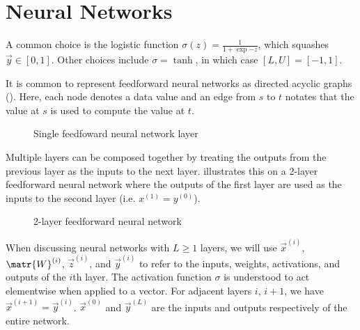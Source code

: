 





\section{Neural Networks}

A common choice is the logistic function $\sigma(z)
= \frac{1}{1+\exp{-z}}$, which squashes $\vec{y} \in [0, 1]$. Other choices
include $\sigma = \tanh$, in which case $[L, U] = [-1, 1]$.

It is common to represent feedforward neural networks as directed acyclic
graphs (). Here, each node denotes a data value and
an edge from $s$ to $t$ notates that the value at $s$ is used to compute the
value at $t$.

\begin{figure}[htpb]
    \centering
    
    \caption{Single feedfoward neural network layer}
    \label{fig:nn-layer}
\end{figure}

Multiple layers can be composed together by treating the outputs from the previous layer
as the inputs to the next layer.  illustrates this on a 2-layer
feedforward neural network where the outputs of the first layer are used as the
inputs to the second layer (i.e. $x^{(1)} = y^{(0)}$).


\begin{figure}[htbp]
    \centering
    
    \caption{2-layer feedforward neural network}
    \label{fig:ffw-nn}
\end{figure}

When discussing neural networks with $L \geq 1$ layers, we will use
$\vec{x}^{(i)}$, $\matr{W}^{(i)}$, $\vec{z}^{(i)}$, and $\vec{y}^{(i)}$ to
refer to the inputs, weights, activations, and outputs of the $i$th layer. The
activation function $\sigma$ is understood to act elementwise when applied to a
vector. For adjacent layers $i$, $i+1$, we have $\vec{x}^{(i+1)} =
\vec{y}^{(i)}$. $\vec{x}^{(0)}$ and $\vec{y}^{(L)}$ are the inputs and outputs
respectively of the entire network.

